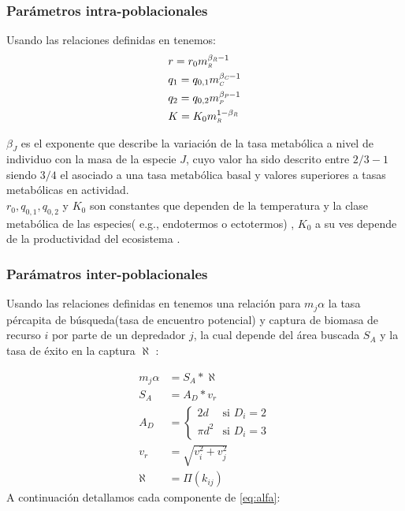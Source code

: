 \subsubsection{Par\'ametros intra-poblacionales}
Usando las relaciones definidas en \cite{savage2004effects} tenemos:
\begin{equation}\label{eq:params3}
\begin{aligned}
&r = r_0m_{\textit{\tiny R}}^{\beta_{\textit{\tiny R}} - 1} \\
&q_1=q_{0,1}m_{\textit{\tiny C}}^{\beta_{\textit{\tiny C}} - 1} \\
&q_2= q_{0,2}m_{\textit{\tiny P}}^{\beta_{\textit{\tiny P}} -1}\\
&K= K_{0}m_{\textit{\tiny R}}^{1-\beta_{\textit{\tiny R}}}
\end{aligned}
\end{equation}

$\beta_J$ es el exponente que describe la variaci\'on de la tasa metab\'olica a nivel de individuo con la masa de la especie $J$, cuyo valor ha sido descrito entre $2/3 - 1$ siendo $3/4$ el asociado a una tasa metab\'olica basal y valores superiores a tasas metab\'olicas en actividad\citep{pawar2012dimensionality,west1997general,savage2004predominance}. \\
$r_0,q_{0,1},q_{0,2}$ y $K_0$ son constantes que dependen de la temperatura y la clase metab\'olica de las especies( e.g., endotermos o ectotermos) , $K_0$ a su ves depende de la productividad del ecosistema \citep{pawar2012dimensionality}.
\subsubsection{Par\'amatros inter-poblacionales}
Usando las relaciones definidas en \citep{pawar2012dimensionality,kiltie2000scaling,mcgill2006allometric,bejan2006unifying} tenemos una relaci\'on para $m_j\alpha$  la tasa p\'ercapita de b\'usqueda(tasa de encuentro potencial) y captura de biomasa de recurso $i$ por parte de un depredador $j$, la cual depende del \'area buscada $S_A$ y la tasa de \'exito en la captura $\aleph$ : 

\begin{equation}\label{eq:alfa}
\begin{aligned}
 m_j\alpha & =  S_A*\aleph \\
 S_A &=  A_D * v_r \\
A_D &=  \begin{cases} 2d & \text{si } D_i = 2 \\ \pi d^2 & \text{si } D_i = 3 \end{cases}\\
v_r &= \sqrt{v_i^2 +v_j^2}\\
\aleph &= \Pi(k_{ij})
\end{aligned}
\end{equation}
A continuaci\'on detallamos cada componente de \eqref{eq:alfa}:\\

